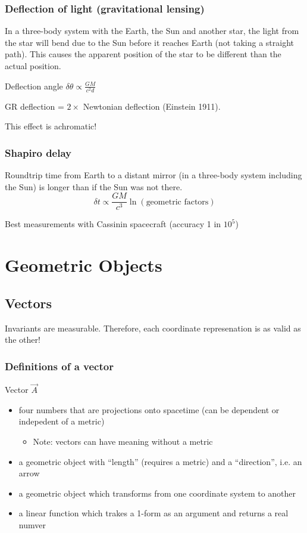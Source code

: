 \documentclass[a4paper]{article} %
\begin{document}
\subsubsection{Deflection of light (gravitational lensing)}
In a three-body system with the Earth, the Sun and another star, the light from the star will bend due to the Sun before it reaches Earth (not taking a straight path). This causes the apparent position of the star to be different than the actual position.

Deflection angle $\delta\theta \propto \frac{GM}{c^2d}$

GR deflection = $2\times$ Newtonian deflection (Einstein 1911). 

This effect is achromatic!

\subsubsection{Shapiro delay}
Roundtrip time from Earth to a distant mirror (in a three-body system including the Sun) is longer than if the Sun was not there.
\begin{equation}
\delta t\propto \frac{GM}{c^3}\ln(\text{geometric factors})
\end{equation}

Best measurements with Cassinin spacecraft (accuracy 1 in $10^5$)

\section{Geometric Objects}

\subsection{Vectors}
Invariants are measurable. Therefore, each coordinate represenation is as valid as the other!

\subsubsection{Definitions of a vector}
Vector $\vec{A}$
\begin{itemize}
\item four numbers that are projections onto spacetime (can be dependent or indepedent of a metric)
\begin{itemize}
\item Note: vectors can have meaning without a metric
\end{itemize}
\item a geometric object with ``length'' (requires a metric) and a ``direction'', i.e. an arrow
\item a geometric object which transforms from one coordinate system to another
\item a linear function which trakes a 1-form as an argument and returns a real numver
\end{itemize}
\end{document}
